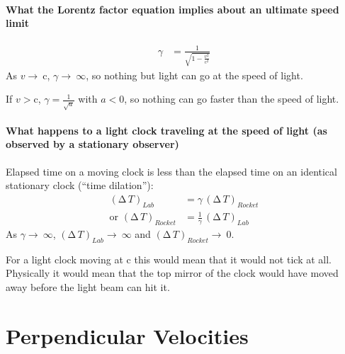 \documentclass[pagesize,headsepline,10pt,parskip=half]{scrreprt}
\newcommand*\mdelta[1]{\ensuremath{\mathrm{\Delta\,}#1}}
\newcommand{\const}[1]{\ensuremath{\mathrm{#1}}}
\renewcommand{\c}{\const{c}}
\begin{document}
      \paragraph{What the Lorentz factor equation implies about an ultimate speed limit}
        \begin{align*}
          \gamma &= \frac{1}{\sqrt{1 - \frac{v^2}{\c^2}}}
        \end{align*}
        As $v \rightarrow~\c$, $\gamma \rightarrow~\infty$, so nothing but light
        can go at the speed of light.

        If $v > \c$, $\gamma = \frac{1}{\sqrt{a}}$ with $a < 0$, so nothing
        can go faster than the speed of light.

      \paragraph{What happens to a light clock traveling at the speed of light (as observed by a stationary observer)}
        Elapsed time on a moving clock is less than the elapsed time on an
        identical stationary clock (``time dilation''):
        \begin{align*}
          {(\mdelta{T})}_{Lab} &= \gamma \, {(\mdelta{T})}_{Rocket}\\
          \text{or } {(\mdelta{T})}_{Rocket} &= \frac{1}{\gamma} \, {(\mdelta{T})}_{Lab}
        \end{align*}
        As $\gamma \rightarrow~\infty$, ${(\mdelta{T})}_{Lab} \rightarrow~\infty$
        and ${(\mdelta{T})}_{Rocket} \rightarrow~0$.

        For a light clock moving at \c{} this would mean that it would not tick at all.
        Physically it would mean that the top mirror of the clock would have moved
        away before the light beam can hit it.

    \clearpage
    \section{Perpendicular Velocities}
\end{document}
